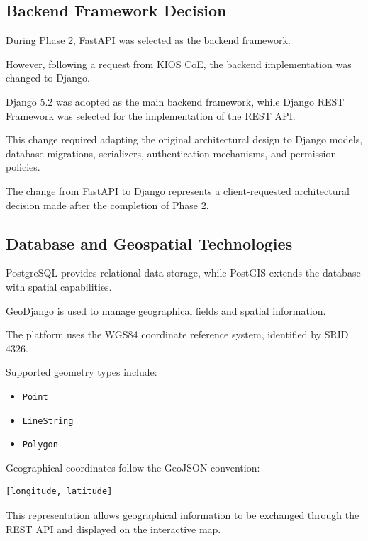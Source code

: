 \documentclass[11pt,a4paper]{article}
\begin{document}
\subsection{Backend Framework Decision}

During Phase 2, FastAPI was selected as the backend
framework.

However, following a request from KIOS CoE, the
backend implementation was changed to Django.

Django 5.2 was adopted as the main backend framework,
while Django REST Framework was selected for the
implementation of the REST API.

This change required adapting the original architectural
design to Django models, database migrations, serializers,
authentication mechanisms, and permission policies.

The change from FastAPI to Django represents a
client-requested architectural decision made after
the completion of Phase 2.

\subsection{Database and Geospatial Technologies}

PostgreSQL provides relational data storage, while
PostGIS extends the database with spatial capabilities.

GeoDjango is used to manage geographical fields
and spatial information.

The platform uses the WGS84 coordinate reference system,
identified by SRID 4326.

Supported geometry types include:

\begin{itemize}
    \item \texttt{Point}
    \item \texttt{LineString}
    \item \texttt{Polygon}
\end{itemize}

Geographical coordinates follow the GeoJSON convention:

\begin{lstlisting}
[longitude, latitude]
\end{lstlisting}

This representation allows geographical information
to be exchanged through the REST API and displayed
on the interactive map.

\end{document}
